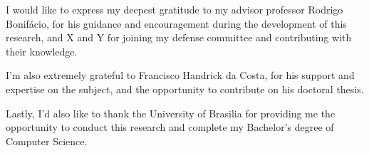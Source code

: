 I would like to express my deepest gratitude to my advisor professor Rodrigo Bonifácio, for his guidance and encouragement during the development of this research, and X and Y for joining my defense committee and contributing with their knowledge.

I'm also extremely grateful to Francisco Handrick da Costa, for his support and expertise on the subject, and the opportunity to contribute on his doctoral thesis.

Lastly, I'd also like to thank the University of Brasilia for providing me the opportunity to conduct this research and complete my Bachelor's degree of Computer Science.